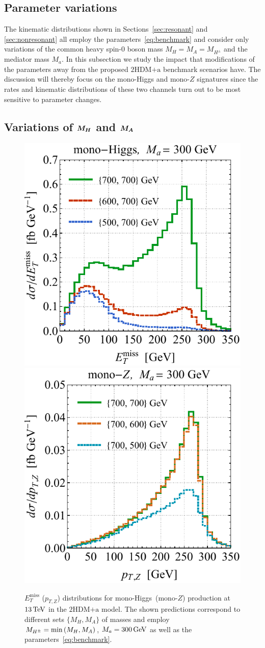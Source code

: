 \documentclass[a4paper, 11pt,notoc]{article}
\newcommand{\MET}{\ensuremath{E_T^\mathrm{miss}}\xspace}
\newcommand{\mA}{\ensuremath{M_{A}}\xspace}
\newcommand{\ma}{\ensuremath{M_{a}}\xspace}
\newcommand{\mH}{\ensuremath{M_{H}}\xspace}
\newcommand{\mHc}{\ensuremath{M_{H^{\pm}}}\xspace}
\newcommand{\hdma}{\ensuremath{\textrm{2HDM+a}}\xspace}
\def\bm#1{\mbox{\boldmath$#1$\unboldmath}}
\begin{document}
\subsection{Parameter variations}

The  kinematic distributions shown in Sections~\ref{sec:resonant} and \ref{sec:nonresonant}  all employ the parameters~\eqref{eq:benchmark} and consider only variations of the common heavy  {\color{red} spin-0 boson}  mass $\mH = \mA = \mHc$ and the mediator mass $\ma$.  In this subsection we study the impact that modifications of the parameters away from the proposed \hdma benchmark scenarios have. The  discussion will thereby focus on the mono-Higgs and mono-$Z$ signatures since the rates and kinematic distributions of these two channels turn out to be  most sensitive to parameter changes. 

\subsection*{Variations of $\bm{\mH}$ and $\bm{\mA}$}

\begin{figure}[t!]
\centering
\includegraphics[height=0.45\textwidth]{mvarl.pdf} \qquad 
\includegraphics[height=0.45\textwidth]{mvarr.pdf}
\vspace{2mm}
\caption{\label{fig:mvar} $\MET$ ($p_{T,Z}$) distributions for mono-Higgs~(mono-$Z$) production at $13 \, {\rm TeV}$ in the \hdma model.  The shown predictions  correspond to different sets $\{M_{H}, M_A\}$ of masses and employ $\mHc = {\rm min} \left ( \mH, \mA \right )$, $M_a = 300 \, {\rm GeV}$  as well as the parameters~\eqref{eq:benchmark}.}
\end{figure}
\end{document}
